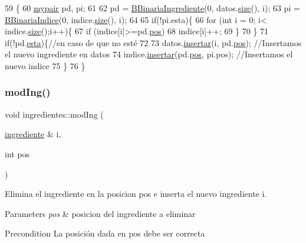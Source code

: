 \begin{DoxyCode}
59                                          \{
60     \hyperlink{structmypair}{mypair} pd, pi;
61 
62     pd = \hyperlink{classingredientes_af54ca9dbd807c345f6f953a2c63172de}{BBinariaIngrediente}(0, datos.\hyperlink{classVD_a411ad026db1c8e0617d9031f1f1017a5}{size}(), i);
63     pi = \hyperlink{classingredientes_abfbdb4c010ef4a72c750a077645eb4f0}{BBinariaIndice}(0, indice.\hyperlink{classVD_a411ad026db1c8e0617d9031f1f1017a5}{size}(), i);
64 
65     \textcolor{keywordflow}{if}(!pi.esta)\{
66                 \textcolor{keywordflow}{for} (\textcolor{keywordtype}{int} i = 0; i< indice.\hyperlink{classVD_a411ad026db1c8e0617d9031f1f1017a5}{size}();i++)\{
67                     \textcolor{keywordflow}{if} (indice[i]>=pd.\hyperlink{structmypair_a3cfe391d3fe21767719a321dfac81fad}{pos})
68                         indice[i]++;
69             \}
70     \}
71     \textcolor{keywordflow}{if}(!pd.\hyperlink{structmypair_a67eadf826beeb0527c5156298fd9f5c3}{esta})\{\textcolor{comment}{//en caso de que no esté}
72 
73         datos.\hyperlink{classVD_a10bba26b426aa83456437543d794b429}{insertar}(i, pd.\hyperlink{structmypair_a3cfe391d3fe21767719a321dfac81fad}{pos}); \textcolor{comment}{//Insertamos el nuevo ingrediente en datos}
74         indice.\hyperlink{classVD_a10bba26b426aa83456437543d794b429}{insertar}(pd.\hyperlink{structmypair_a3cfe391d3fe21767719a321dfac81fad}{pos}, pi.pos); \textcolor{comment}{//Insertamos el nuevo indice}
75     \}
76 \}
\end{DoxyCode}
\mbox{\label{classingredientes_a936869362643db1949a326167c668270}} 
\subsubsection{\texorpdfstring{mod\+Ing()}{modIng()}}
{\footnotesize\ttfamily void ingredientes\+::mod\+Ing (\begin{DoxyParamCaption}\item[{\hyperlink{classingrediente}{ingrediente} \&}]{i,  }\item[{int}]{pos }\end{DoxyParamCaption})}



Elimina el ingrediente en la posicion pos e inserta el nuevo ingrediente i. 


\begin{DoxyParams}{Parameters}
{\em pos} & posicion del ingrediente a eliminar \\
\hline
\end{DoxyParams}
\begin{DoxyPrecond}{Precondition}
La posición dada en pos debe ser correcta 
\end{DoxyPrecond}


